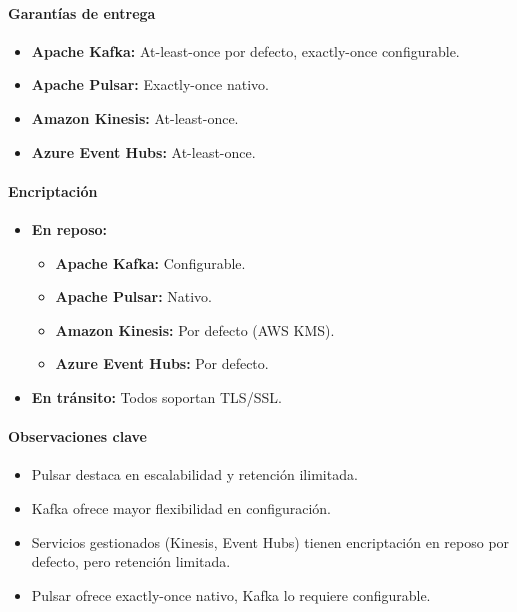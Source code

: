 \paragraph{Garantías de entrega}
\begin{itemize}
    \item \textbf{Apache Kafka:} At-least-once por defecto, exactly-once configurable.
    \item \textbf{Apache Pulsar:} Exactly-once nativo.
    \item \textbf{Amazon Kinesis:} At-least-once.
    \item \textbf{Azure Event Hubs:} At-least-once.
\end{itemize}

\paragraph{Encriptación}
\begin{itemize}
    \item \textbf{En reposo:}
    \begin{itemize}
        \item \textbf{Apache Kafka:} Configurable.
        \item \textbf{Apache Pulsar:} Nativo.
        \item \textbf{Amazon Kinesis:} Por defecto (AWS KMS).
        \item \textbf{Azure Event Hubs:} Por defecto.
    \end{itemize}
    \item \textbf{En tránsito:} Todos soportan TLS/SSL.
\end{itemize}

\paragraph{Observaciones clave}
\begin{itemize}
    \item Pulsar destaca en escalabilidad y retención ilimitada.
    \item Kafka ofrece mayor flexibilidad en configuración.
    \item Servicios gestionados (Kinesis, Event Hubs) tienen encriptación en reposo por defecto, pero retención limitada.
    \item Pulsar ofrece exactly-once nativo, Kafka lo requiere configurable.
\end{itemize}

\clearpage

